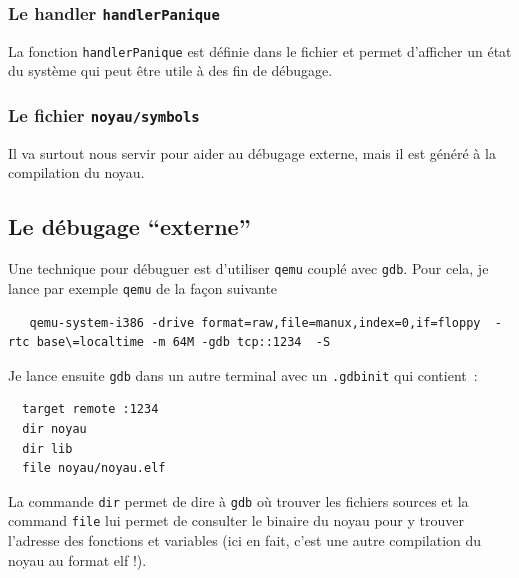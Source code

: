 %
\subsubsection{Le handler {\tt handlerPanique}}

   La fonction {\tt handlerPanique} est définie dans le fichier
 et permet d'afficher un état du
système qui peut être utile à des fin de débugage.

%
\subsubsection{Le fichier {\tt noyau/symbols}}

   Il va surtout nous servir pour aider au débugage externe, mais il
est généré à la compilation du noyau.
 
%
\subsection{Le débugage ``externe''}
\label{subsection:debugage_externe}

   Une technique pour débuguer est d'utiliser {\tt qemu} couplé avec
{\tt gdb}. Pour cela, je lance par exemple {\tt qemu} de la façon suivante

\begin{lstlisting}
   qemu-system-i386 -drive format=raw,file=manux,index=0,if=floppy  -rtc base\=localtime -m 64M -gdb tcp::1234  -S 
\end{lstlisting}

   Je lance ensuite {\tt gdb} dans un autre terminal avec un
\lstinline!.gdbinit! qui contient~:

\begin{verbatim}
  target remote :1234
  dir noyau
  dir lib
  file noyau/noyau.elf
\end{verbatim}

   La commande \lstinline!dir! permet de dire à {\tt gdb} où trouver
les fichiers sources et la command \lstinline:file: lui permet de
consulter le binaire du noyau pour y trouver l'adresse des fonctions
et variables (ici en fait, c'est une autre compilation du noyau au
format {\sc elf} !).

